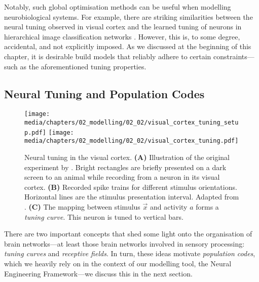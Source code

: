 Notably, such global optimisation methods can be useful when modelling neurobiological systems.
For example, there are striking similarities between the neural tuning observed in visual cortex and the learned tuning of neurons in hierarchical image classification networks \citep{yamins2016using}.
However, this is, to some degree, accidental, and not explicitly imposed.
As we discussed at the beginning of this chapter, it is desirable build models that reliably adhere to certain constraints---such as the aforementioned tuning properties.

\subsection{Neural Tuning and Population Codes}
\label{sec:neural_tuning}

\begin{figure}
	\centering
	\texttt{[image: media/chapters/02\_modelling/02\_02/visual\_cortex\_tuning\_setup.pdf]}%
	\texttt{[image: media/chapters/02\_modelling/02\_02/visual\_cortex\_tuning.pdf]}
	\caption[Neural tuning in the visual cortex]{Neural tuning in the visual cortex.
	\textbf{(A)} Illustration of the original experiment by \citet{hubel1959receptive}. Bright rectangles are briefly presented on a dark screen to an animal while recording from a neuron in its visual cortex. \textbf{(B)} Recorded spike trains for different stimulus orientations. Horizontal lines are the stimulus presentation interval. Adapted from \citet[Figure~3]{hubel1959receptive}. \textbf{(C)} The mapping between stimulus $\vec x$ and activity $a$ forms a \emph{tuning curve}. This neuron is tuned to vertical bars.}
	\label{fig:visual_cortex_tuning}
\end{figure}

There are two important concepts that shed some light onto the organisation of brain networks---at least those brain networks involved in sensory processing: \emph{tuning curves} and \emph{receptive fields}.
In turn, these ideas motivate \emph{population codes}, which we heavily rely on in the context of our modelling tool, the Neural Engineering Framework---we discuss this in the next section.

